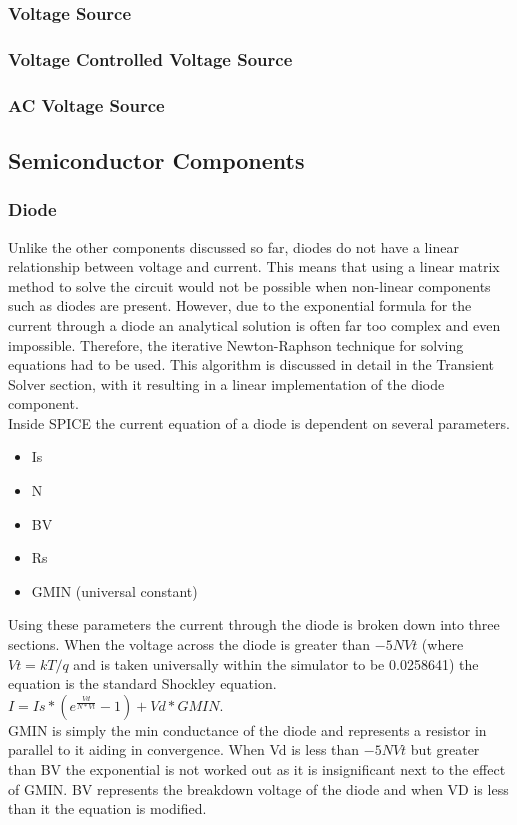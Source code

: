 \documentclass{article}
\begin{document}
\subsubsection{Voltage Source}
\subsubsection{Voltage Controlled Voltage Source}
\subsubsection{AC Voltage Source}
\newpage

\subsection{Semiconductor Components}
\subsubsection{Diode}
Unlike the other components discussed so far, diodes do not have a linear relationship between voltage and current. This means that using a linear matrix method to solve the circuit would not be possible when non-linear components such as diodes are present. However, due to the exponential formula for the current through a diode an analytical solution is often far too complex and even impossible. Therefore, the iterative Newton-Raphson technique for solving equations had to be used. This algorithm is discussed in detail in the Transient Solver section, with it resulting in a linear implementation of the diode component.
\\
Inside SPICE the current equation of a diode is dependent on several parameters. 
\begin{itemize}
    \item Is
    \item N
    \item BV
    \item Rs
    \item GMIN (universal constant)
\end{itemize}
Using these parameters the current through the diode is broken down into three sections. When the voltage across the diode is greater than $-5NVt$ (where $Vt = kT/q$ and is taken universally within the simulator to be 0.0258641) the equation is the standard Shockley equation.\bigbreak \\ $I = Is*(e^{\frac{Vd}{N*Vt}}-1) + Vd*GMIN$. \\\bigbreak GMIN is simply the min conductance of the diode and represents a resistor in parallel to it aiding in convergence. When Vd is less than $-5NVt$ but greater than BV the exponential is not worked out as it is insignificant next to the effect of GMIN. BV represents the breakdown voltage of the diode and when VD is less than it the equation is modified.\bigbreak
\end{document}
